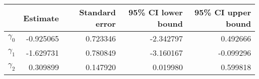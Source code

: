 \begin{tabular}{lrrrr}
\toprule
{} &  Estimate &  Standard error &  95\% CI lower bound &  95\% CI upper bound \\
\midrule
$\gamma_0$ & -0.925065 &        0.723346 &            -2.342797 &             0.492666 \\
$\gamma_1$ & -1.629731 &        0.780849 &            -3.160167 &            -0.099296 \\
$\gamma_2$ &  0.309899 &        0.147920 &             0.019980 &             0.599818 \\
\bottomrule
\end{tabular}
